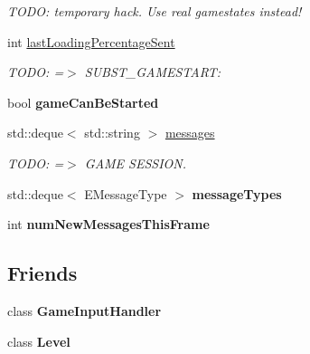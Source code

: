 \begin{DoxyCompactItemize}
\begin{DoxyCompactList}\small\item\em \-T\-O\-D\-O\-: temporary hack. \-Use real gamestates instead! \end{DoxyCompactList}\item 
\hypertarget{classGame_a0ce5623a053c5401b896d372cce513f5}{
int \hyperlink{classGame_a0ce5623a053c5401b896d372cce513f5}{last\-Loading\-Percentage\-Sent}}
\label{d9/d68/classGame_a0ce5623a053c5401b896d372cce513f5}

\begin{DoxyCompactList}\small\item\em \-T\-O\-D\-O\-: =$>$ \-S\-U\-B\-S\-T\-\_\-\-G\-A\-M\-E\-S\-T\-A\-R\-T\-: \end{DoxyCompactList}\item 
\hypertarget{classGame_a866074dbfbf753f29244a569b2559d16}{
bool {\bfseries game\-Can\-Be\-Started}}
\label{d9/d68/classGame_a866074dbfbf753f29244a569b2559d16}

\item 
\hypertarget{classGame_ab16696d6f122095ef157ab7e7eefb242}{
std\-::deque$<$ std\-::string $>$ \hyperlink{classGame_ab16696d6f122095ef157ab7e7eefb242}{messages}}
\label{d9/d68/classGame_ab16696d6f122095ef157ab7e7eefb242}

\begin{DoxyCompactList}\small\item\em \-T\-O\-D\-O\-: =$>$ \-G\-A\-M\-E \-S\-E\-S\-S\-I\-O\-N. \end{DoxyCompactList}\item 
\hypertarget{classGame_a2b1b56feb9fc628a8232563fa3bf1f2c}{
std\-::deque$<$ \-E\-Message\-Type $>$ {\bfseries message\-Types}}
\label{d9/d68/classGame_a2b1b56feb9fc628a8232563fa3bf1f2c}

\item 
\hypertarget{classGame_a943f55afb5cf38e311d3408c328d5c14}{
int {\bfseries num\-New\-Messages\-This\-Frame}}
\label{d9/d68/classGame_a943f55afb5cf38e311d3408c328d5c14}

\end{DoxyCompactItemize}
\subsection*{\-Friends}
\begin{DoxyCompactItemize}
\item 
\hypertarget{classGame_a25c0ce204c26a6de80af5567e46dc96a}{
class {\bfseries \-Game\-Input\-Handler}}
\label{d9/d68/classGame_a25c0ce204c26a6de80af5567e46dc96a}

\item 
\hypertarget{classGame_a564b27969f812d1f057f58288257c783}{
class {\bfseries \-Level}}
\label{d9/d68/classGame_a564b27969f812d1f057f58288257c783}

\end{DoxyCompactItemize}


